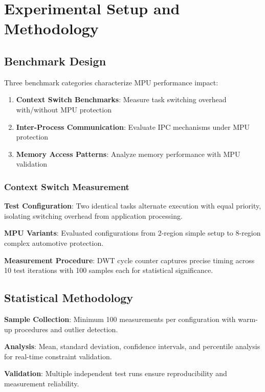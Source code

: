 \chapter{Experimental Setup and Methodology}
\label{sec:experimental-methodology}

\section{Benchmark Design}

Three benchmark categories characterize MPU performance impact:

\begin{enumerate}
    \item \textbf{Context Switch Benchmarks}: Measure task switching overhead with/without MPU protection
    \item \textbf{Inter-Process Communication}: Evaluate IPC mechanisms under MPU protection
    \item \textbf{Memory Access Patterns}: Analyze memory performance with MPU validation
\end{enumerate}

\subsection{Context Switch Measurement}

\textbf{Test Configuration}: Two identical tasks alternate execution with equal priority, isolating switching overhead from application processing.

\textbf{MPU Variants}: Evaluated configurations from 2-region simple setup to 8-region complex automotive protection.

\textbf{Measurement Procedure}: DWT cycle counter captures precise timing across 10 test iterations with 100 samples each for statistical significance.

\section{Statistical Methodology}

\textbf{Sample Collection}: Minimum 100 measurements per configuration with warm-up procedures and outlier detection.

\textbf{Analysis}: Mean, standard deviation, confidence intervals, and percentile analysis for real-time constraint validation.

\textbf{Validation}: Multiple independent test runs ensure reproducibility and measurement reliability.


